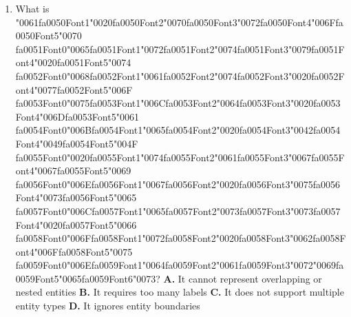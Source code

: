 \documentclass[11pt]{article}
\begin{document}
\begin{enumerate}[leftmargin=*]
  \item What is {\char"0061}{\csname fa0050Font1\endcsname\char"0020}{\csname fa0050Font2\endcsname\char"0070}{\csname fa0050Font3\endcsname\char"0072}{\csname fa0050Font4\endcsname\char"006F}{\csname fa0050Font5\endcsname\char"0070} {\csname fa0051Font0\endcsname\char"0065}{\csname fa0051Font1\endcsname\char"0072}{\csname fa0051Font2\endcsname\char"0074}{\csname fa0051Font3\endcsname\char"0079}{\csname fa0051Font4\endcsname\char"0020}{\csname fa0051Font5\endcsname\char"0074} {\csname fa0052Font0\endcsname\char"0068}{\csname fa0052Font1\endcsname\char"0061}{\csname fa0052Font2\endcsname\char"0074}{\csname fa0052Font3\endcsname\char"0020}{\csname fa0052Font4\endcsname\char"0077}{\csname fa0052Font5\endcsname\char"006F} {\csname fa0053Font0\endcsname\char"0075}{\csname fa0053Font1\endcsname\char"006C}{\csname fa0053Font2\endcsname\char"0064}{\csname fa0053Font3\endcsname\char"0020}{\csname fa0053Font4\endcsname\char"006D}{\csname fa0053Font5\endcsname\char"0061} {\csname fa0054Font0\endcsname\char"006B}{\csname fa0054Font1\endcsname\char"0065}{\csname fa0054Font2\endcsname\char"0020}{\csname fa0054Font3\endcsname\char"0042}{\csname fa0054Font4\endcsname\char"0049}{\csname fa0054Font5\endcsname\char"004F} {\csname fa0055Font0\endcsname\char"0020}{\csname fa0055Font1\endcsname\char"0074}{\csname fa0055Font2\endcsname\char"0061}{\csname fa0055Font3\endcsname\char"0067}{\csname fa0055Font4\endcsname\char"0067}{\csname fa0055Font5\endcsname\char"0069} {\csname fa0056Font0\endcsname\char"006E}{\csname fa0056Font1\endcsname\char"0067}{\csname fa0056Font2\endcsname\char"0020}{\csname fa0056Font3\endcsname\char"0075}{\csname fa0056Font4\endcsname\char"0073}{\csname fa0056Font5\endcsname\char"0065} {\csname fa0057Font0\endcsname\char"006C}{\csname fa0057Font1\endcsname\char"0065}{\csname fa0057Font2\endcsname\char"0073}{\csname fa0057Font3\endcsname\char"0073}{\csname fa0057Font4\endcsname\char"0020}{\csname fa0057Font5\endcsname\char"0066} {\csname fa0058Font0\endcsname\char"006F}{\csname fa0058Font1\endcsname\char"0072}{\csname fa0058Font2\endcsname\char"0020}{\csname fa0058Font3\endcsname\char"0062}{\csname fa0058Font4\endcsname\char"006F}{\csname fa0058Font5\endcsname\char"0075} {\csname fa0059Font0\endcsname\char"006E}{\csname fa0059Font1\endcsname\char"0064}{\csname fa0059Font2\endcsname\char"0061}{\csname fa0059Font3\endcsname\char"0072}{\char"0069}{\csname fa0059Font5\endcsname\char"0065}{\csname fa0059Font6\endcsname\char"0073}?
    \textbf{A.} It cannot represent overlapping or nested entities
    \textbf{B.} It requires too many labels
    \textbf{C.} It does not support multiple entity types
    \textbf{D.} It ignores entity boundaries


\end{enumerate}
\end{document}
